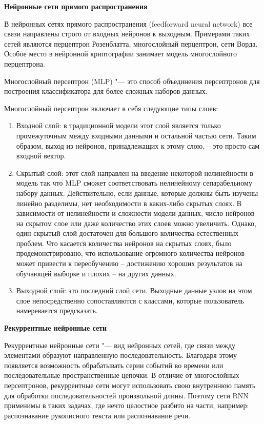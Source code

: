 \noindent \textbf{Нейронные сети прямого распространения}
\bigskip

В нейронных сетях прямого распространения (feedforward neural network) все связи направлены строго от входных нейронов к выходным.
Примерами таких сетей являются перцептрон Розенблатта, многослойный перцептрон, сети Ворда.
Особое место в нейронной криптографии занимает модель многослойного перцептрона.

\bigskip

Многослойный персептрон (MLP) "--- это способ объединения персептронов для построения классификатора для более сложных наборов
данных.
\bigskip

Многослойный персептрон включает в себя следующие типы слоев:
\begin{enumerate}
	\item Входной слой: в традиционной модели этот слой является только промежуточным между входными данными и остальной частью сети. Таким
	образом, выход из нейронов, принадлежащих к этому слою, – это просто сам входной вектор.
	
	\item Скрытый слой: этот слой направлен на введение некоторой нелинейности в модель так что MLP сможет соответствовать нелинейному
	сепарабельному набору данных. Действительно, если данные, которые должны быть изучены линейно разделимы, нет необходимости в каких-либо
	скрытых слоях. В зависимости от нелинейности и сложности модели данных, число нейронов на скрытом слое или даже количество этих слоев можно
	увеличить. Однако, один скрытый слой достаточен для большого количества естественных проблем.
	Что касается количества нейронов на скрытых слоях, было продемонстрировано, что использование огромного количества нейронов
	может привести к переобучению – достижению хороших результатов на обучающей выборке и плохих – на других данных.
	\item Выходной слой: это последний слой сети. Выходные данные узлов на этом слое непосредственно сопоставляются с классами, которые пользователь
	намеревается предсказать.
\end{enumerate}

\bigskip
\noindent \textbf{Рекуррентные нейронные сети}
\bigskip

Рекуррентные нейронные сети "--- вид нейронных сетей, где связи между элементами образуют направленную последовательность.
Благодаря этому появляется возможность обрабатывать серии событий во времени или последовательные пространственные цепочки.
В отличие от многослойных персептронов, рекуррентные сети могут использовать свою внутреннюю память для обработки
последовательностей произвольной длины. Поэтому сети RNN применимы в таких задачах, где нечто целостное разбито
на части, например: распознавание рукописного текста или распознавание речи.

